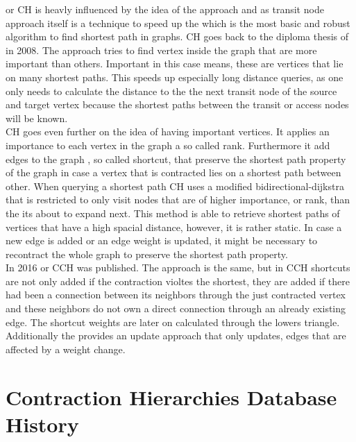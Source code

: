 \cite[Contraction Hierarchies]{Geisberger_2012} or CH is heavly influenced by the idea of the \cite[Transit-Node]{Bast_2007} approach and as transit node approach itself is a
technique to speed up the \cite[Dijkstra Algorithm]{Dijkstra_1959} which is the most basic and robust algorithm to find shortest path in graphs. CH goes back to the diploma thesis of \cite[Geisberger]{Geisberger} in 2008. The \cite[Transit-Node]{Bast_2007} approach
tries to find vertex inside the graph that are more important than others. Important in this case means, these are vertices that lie on many shortest paths. This speeds up 
especially long distance queries, as one only needs to calculate the distance to the the next transit node of the source and target vertex because the shortest paths between 
the transit or access nodes will be known. \\ 
CH goes even further on the idea of having important vertices. It applies an importance to each vertex in the graph a so called rank. Furthermore it add edges to the graph
, so called shortcut, that preserve the shortest path property of the graph in case a vertex that is contracted lies on a shortest path between other. When querying a shortest
path CH uses a modified bidirectional-dijkstra that is restricted to only visit nodes that are of higher importance, or rank, than the its about to expand next.
This method is able to retrieve shortest paths of vertices that have a high spacial distance, however, it is rather static. In case a new edge is added or an edge weight is updated, 
it might be necessary to recontract the whole graph to preserve the shortest path property. \\
In 2016 \cite[Customization Contraction Hierarchies]{CCH} or CCH was published. The approach is the same, but in CCH shortcuts are not only added if the contraction violtes the shortest,
they are added if there had been a connection between its neighbors through the just contracted vertex and these neighbors do not own a direct connection through an already existing edge.
The shortcut weights are later on calculated through the lowers triangle. Additionally the \cite[Customization Contraction Hierarchies]{CCH} provides an update approach that only updates,
edges that are affected by a weight change.

\section{Contraction Hierarchies Database History}\label{sec:related_work:database}

